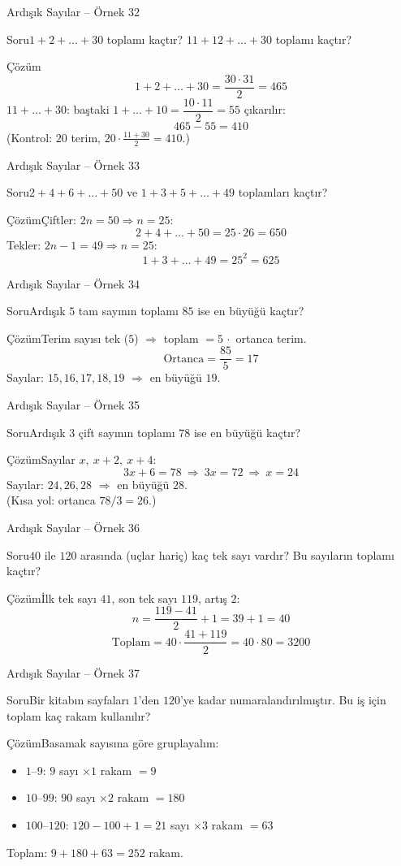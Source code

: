 \documentclass[aspectratio=169,11pt,handout]{beamer}
\newcommand{\soru}[3]{%
\begin{frame}{#1}
  \begin{block}{Soru}\large #2\end{block}
  \pause
  \begin{exampleblock}{Çözüm}\large #3\end{exampleblock}
\end{frame}}
\begin{document}
\soru{Ardışık Sayılar -- Örnek 32}
{\(1+2+\dots+30\) toplamı kaçtır? \(11+12+\dots+30\) toplamı kaçtır?}
{\[1+2+\dots+30=\frac{30\cdot 31}{2}=465\]
\(11+\dots+30\): baştaki \(1+\dots+10=\dfrac{10\cdot 11}{2}=55\) çıkarılır:
\[465-55=410\]
(Kontrol: \(20\) terim, \(20\cdot\frac{11+30}{2}=410\).)}

\soru{Ardışık Sayılar -- Örnek 33}
{\(2+4+6+\dots+50\) ve \(1+3+5+\dots+49\) toplamları kaçtır?}
{Çiftler: \(2n=50\Rightarrow n=25\):
\[2+4+\dots+50=25\cdot 26=650\]
Tekler: \(2n-1=49\Rightarrow n=25\):
\[1+3+\dots+49=25^2=625\]}

\soru{Ardışık Sayılar -- Örnek 34}
{Ardışık \(5\) tam sayının toplamı \(85\) ise en büyüğü kaçtır?}
{Terim sayısı tek (\(5\)) \(\Rightarrow\) toplam \(=5\,\cdot\) ortanca terim.
\[\text{Ortanca}=\frac{85}{5}=17\]
Sayılar: \(15,16,17,18,19\) \(\Rightarrow\) en büyüğü \(19\).}

\soru{Ardışık Sayılar -- Örnek 35}
{Ardışık \(3\) çift sayının toplamı \(78\) ise en büyüğü kaçtır?}
{Sayılar \(x,\ x+2,\ x+4\):
\[3x+6=78\ \Rightarrow\ 3x=72\ \Rightarrow\ x=24\]
Sayılar: \(24,26,28\) \(\Rightarrow\) en büyüğü \(28\).\\[3pt]
(Kısa yol: ortanca \(78/3=26\).)}

\soru{Ardışık Sayılar -- Örnek 36}
{\(40\) ile \(120\) arasında (uçlar hariç) kaç tek sayı vardır? Bu sayıların toplamı kaçtır?}
{İlk tek sayı \(41\), son tek sayı \(119\), artış \(2\):
\[n=\frac{119-41}{2}+1=39+1=40\]
\[\text{Toplam}=40\cdot\frac{41+119}{2}=40\cdot 80=3200\]}

\soru{Ardışık Sayılar -- Örnek 37}
{Bir kitabın sayfaları \(1\)'den \(120\)'ye kadar numaralandırılmıştır. Bu iş için toplam kaç rakam kullanılır?}
{Basamak sayısına göre gruplayalım:
\begin{itemize}
\item \(1\)--\(9\): \(9\) sayı \(\times 1\) rakam \(=9\)
\item \(10\)--\(99\): \(90\) sayı \(\times 2\) rakam \(=180\)
\item \(100\)--\(120\): \(120-100+1=21\) sayı \(\times 3\) rakam \(=63\)
\end{itemize}
Toplam: \(9+180+63=252\) rakam.}
\end{document}
